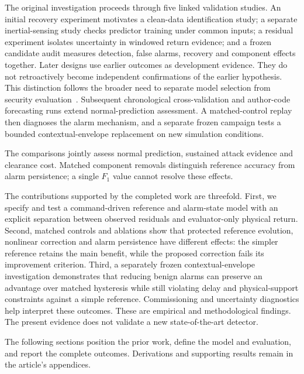 \documentclass[11pt,twocolumn]{article}
\makeatletter
\renewcommand\section{\@startsection{section}{1}{\z@}{-2.5ex plus -1ex minus -.2ex}{1.2ex plus .2ex}{\normalfont\large\bfseries\raggedright}}
\makeatother
\begin{document}
The original investigation proceeds through five linked validation studies. An initial recovery experiment motivates a clean-data identification study; a separate inertial-sensing study checks predictor training under common inputs; a residual experiment isolates uncertainty in windowed return evidence; and a frozen candidate audit measures detection, false alarms, recovery and component effects together. Later designs use earlier outcomes as development evidence. They do not retroactively become independent confirmations of the earlier hypothesis. This distinction follows the broader need to separate model selection from security evaluation~\cite{arp}. Subsequent chronological cross-validation and author-code forecasting runs extend normal-prediction assessment. A matched-control replay then diagnoses the alarm mechanism, and a separate frozen campaign tests a bounded contextual-envelope replacement on new simulation conditions.

The comparisons jointly assess normal prediction, sustained attack evidence and clearance cost. Matched component removals distinguish reference accuracy from alarm persistence; a single $F_1$ value cannot resolve these effects.

The contributions supported by the completed work are threefold. First, we specify and test a command-driven reference and alarm-state model with an explicit separation between observed residuals and evaluator-only physical return. Second, matched controls and ablations show that protected reference evolution, nonlinear correction and alarm persistence have different effects: the simpler reference retains the main benefit, while the proposed correction fails its improvement criterion. Third, a separately frozen contextual-envelope investigation demonstrates that reducing benign alarms can preserve an advantage over matched hysteresis while still violating delay and physical-support constraints against a simple reference. Commissioning and uncertainty diagnostics help interpret these outcomes. These are empirical and methodological findings. The present evidence does not validate a new state-of-the-art detector.


The following sections position the prior work, define the model and evaluation, and report the complete outcomes. Derivations and supporting results remain in the article’s appendices.

\section{Literature Review}\label{sec:literature}
\end{document}
